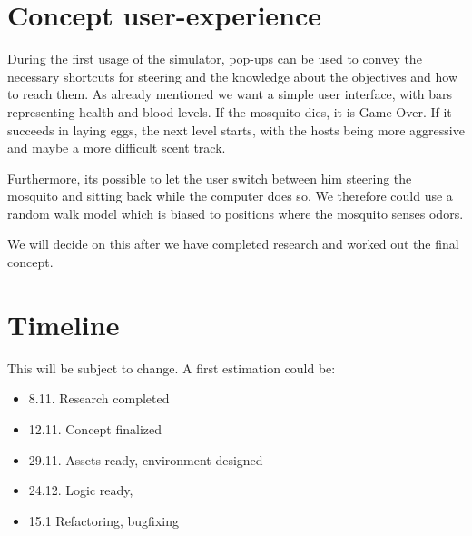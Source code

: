 \documentclass{acm_proc_article-sp}
\begin{document}
\section{Concept user-experience}
During the first usage of the simulator, pop-ups can be used to convey the necessary shortcuts for steering and the knowledge about the objectives and how to reach them. As already mentioned we want a simple user interface, with bars representing health and blood levels. If the mosquito dies, it is Game Over. If it succeeds in laying eggs, the next level starts, with the hosts being more aggressive and maybe a more difficult scent track. 

Furthermore, its possible to let the user switch between him steering the mosquito and sitting back while the computer does so. We therefore could use a random walk model which is biased to positions where the mosquito senses odors.

We will decide on this after we have completed research and worked out the final concept.


\section{Timeline}
This will be subject to change. A first estimation could be:

\begin{itemize}
	\item	8.11. Research completed
	\item 12.11. Concept finalized
	\item 29.11. Assets ready, environment designed
	\item 24.12. Logic ready,
	\item 15.1	Refactoring, bugfixing
\end{itemize}








%

%
%

\balancecolumns
\end{document}
